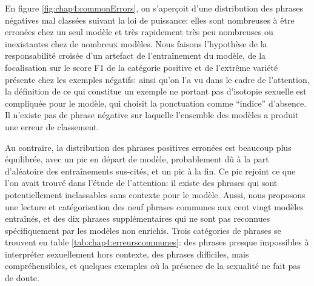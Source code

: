 
En figure \ref{fig:chap4:commonErrors}, on s'aperçoit d'une distribution des phrases négatives mal classées suivant la loi de puissance: elles sont nombreuses à être erronées chez un seul modèle et très rapidement très peu nombreuses ou inexistantes chez de nombreux modèles. Nous faisons l'hypothèse de la responsabilité croisée d'un artefact de l'entraînement du modèle, de la focalisation sur le score F1 de la catégorie positive et de l'extrême variété présente chez les exemples négatifs: ainsi qu'on l'a vu dans le cadre de l'attention, la définition de ce qui constitue un exemple ne portant pas d'isotopie sexuelle est compliquée pour le modèle, qui choisit la ponctuation comme \enquote{indice} d'absence. Il n'existe pas de phrase négative sur laquelle l'ensemble des modèles a produit une erreur de classement.

Au contraire, la distribution des phrases positives erronées est beaucoup plus équilibrée, avec un pic en départ de modèle, probablement dû à la part d'aléatoire des entraînements sus-cités, et un pic à la fin. Ce pic rejoint ce que l'on avait trouvé dans l'étude de l'attention: il existe des phrases qui sont potentiellement inclassables sans contexte pour le modèle. Aussi, nous proposons une lecture et catégorisation des neuf phrases communes aux cent vingt modèles entraînés, et des dix phrases supplémentaires qui ne sont pas reconnues spécifiquement par les modèles non enrichis. Trois catégories de phrases se trouvent en table \ref{tab:chap4:erreurscommunes}: des phrases presque impossibles à interpréter sexuellement hors contexte, des phrases difficiles, mais compréhensibles, et quelques exemples où la présence de la sexualité ne fait pas de doute.

